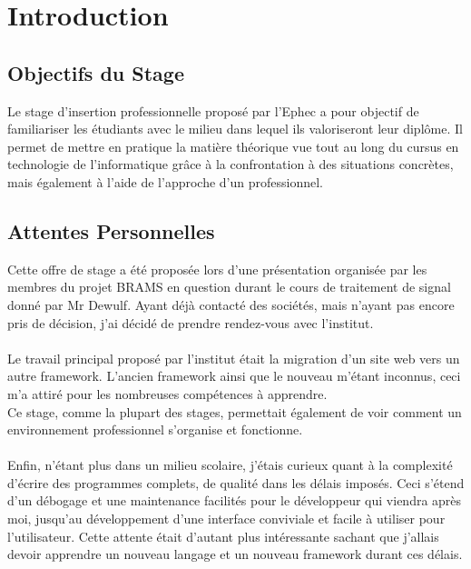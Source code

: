 \documentclass[11pt]{article}
\begin{document}
\newpage

\section{Introduction}

\subsection{Objectifs du Stage}
Le stage d'insertion professionnelle proposé par l'Ephec a pour objectif de familiariser les étudiants avec le milieu dans lequel ils valoriseront leur diplôme.
Il permet de mettre en pratique la matière théorique vue tout au long du cursus en technologie de l'informatique grâce à la confrontation à des situations concrètes, mais également à l'aide de l'approche d'un professionnel.

\subsection{Attentes Personnelles}

Cette offre de stage a été proposée lors d'une présentation organisée par les membres du projet BRAMS en question durant le cours de traitement de signal donné par Mr Dewulf.
Ayant déjà contacté des sociétés, mais n'ayant pas encore pris de décision, j'ai décidé de prendre rendez-vous avec l'institut.\\
\\
Le travail principal proposé par l'institut était la migration d'un site web vers un autre framework.
L'ancien framework ainsi que le nouveau m'étant inconnus, ceci m'a attiré pour les nombreuses compétences à apprendre.\\
Ce stage, comme la plupart des stages, permettait également de voir comment un environnement professionnel s'organise et fonctionne.\\
\\
Enfin, n'étant plus dans un milieu scolaire, j'étais curieux quant à la complexité d'écrire des programmes complets, de qualité dans les délais imposés.
Ceci s'étend d'un débogage et une maintenance facilités pour le développeur qui viendra après moi, jusqu'au développement d'une interface conviviale et facile à utiliser pour l'utilisateur.
Cette attente était d'autant plus intéressante sachant que j'allais devoir apprendre un nouveau langage et un nouveau framework durant ces délais.

\newpage
\end{document}
